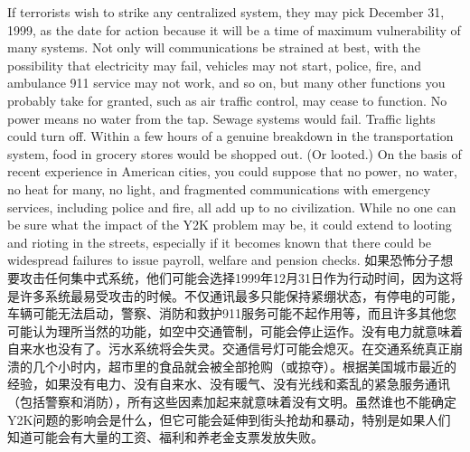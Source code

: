 \begin{Parallel}{97mm}{45mm}
  \ParallelLText
  {If terrorists wish to strike any centralized system, they may pick December 31, 1999, as the date for action because it will be a time of maximum vulnerability of many systems. Not only will communications be strained at best, with the possibility that electricity may fail, vehicles may not start, police, fire, and ambulance 911 service may not work, and so on, but many other functions you probably take for granted, such as air traffic control, may cease to function. No power means no water from the tap. Sewage systems would fail. Traffic lights could turn off. Within a few hours of a genuine breakdown in the transportation system, food in grocery stores would be shopped out. (Or looted.) On the basis of recent experience in American cities, you could suppose that no power, no water, no heat for many, no light, and fragmented communications with emergency services, including police and fire, all add up to no civilization. While no one can be sure what the impact of the Y2K problem may be, it could extend to looting and rioting in the streets, especially if it becomes known that there could be widespread failures to issue payroll, welfare and pension checks. }  
  \ParallelRText
  {\small 如果恐怖分子想要攻击任何集中式系统，他们可能会选择1999年12月31日作为行动时间，因为这将是许多系统最易受攻击的时候。不仅通讯最多只能保持紧绷状态，有停电的可能，车辆可能无法启动，警察、消防和救护911服务可能不起作用等，而且许多其他您可能认为理所当然的功能，如空中交通管制，可能会停止运作。没有电力就意味着自来水也没有了。污水系统将会失灵。交通信号灯可能会熄灭。在交通系统真正崩溃的几个小时内，超市里的食品就会被全部抢购（或掠夺）。根据美国城市最近的经验，如果没有电力、没有自来水、没有暖气、没有光线和紊乱的紧急服务通讯（包括警察和消防），所有这些因素加起来就意味着没有文明。虽然谁也不能确定Y2K问题的影响会是什么，但它可能会延伸到街头抢劫和暴动，特别是如果人们知道可能会有大量的工资、福利和养老金支票发放失败。}
  \ParallelPar



\end{Parallel}
